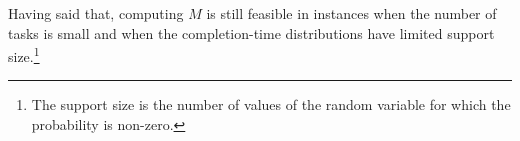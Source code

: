 \documentclass[letterpaper]{article} %
\newcommand\Tal[1]{\nb{\textbf{Tal:}}{green}{#1}}
\newcommand\Roni[1]{\nb{\textbf{Roni:}}{blue}{#1}}
\begin{document}



Having said that, computing $M$ is still feasible in instances when the number of tasks is small and when the completion-time distributions have limited support size.\footnote{The support size is the number of values of the random variable for which the probability is non-zero.}

\end{document}
